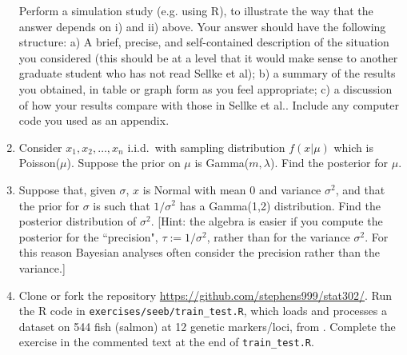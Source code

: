 \documentclass[12pt]{article}
\begin{document}
\begin{enumerate}
Perform a simulation study (e.g. using R), to
illustrate the way that the answer depends on i) and ii) above. Your answer should have the following structure: a) A brief, precise, and self-contained description of the situation you considered (this should be at a level that it would make sense to another graduate student who has not read Sellke et al); b) a summary of the results you obtained, in table or graph form as you feel appropriate; c) a discussion of how your results compare with those in Sellke et al.. Include any computer code you used as an appendix.

\item Consider $x_1, x_2, \ldots, x_n$ i.i.d.\ with sampling distribution $f(x|\mu)$ which is Poisson($\mu$).  Suppose the prior on $\mu$ is Gamma($m, \lambda$).  Find the posterior for $\mu$.


\item  Suppose that, given $\sigma$, $x$ is Normal with mean 0 and variance $\sigma^2$, and that the prior for $\sigma$ is such that $1/\sigma^2$ has a Gamma(1,2) distribution.  Find the posterior distribution of $\sigma^2$.
[Hint: the algebra is easier if you compute the posterior for the ``precision", $\tau:=1/\sigma^2$, rather than for the variance $\sigma^2$. For this reason
Bayesian analyses often consider the precision rather than the variance.]


\item Clone or fork the repository \url{https://github.com/stephens999/stat302/}. Run the R code in \verb|exercises/seeb/train_test.R|, which loads
and processes a dataset on 544 fish (salmon) at 12 genetic markers/loci, from \cite{seeb:2007}. Complete the exercise in the commented
text at the end of \verb|train_test.R|.



\end{enumerate}



\end{document}
